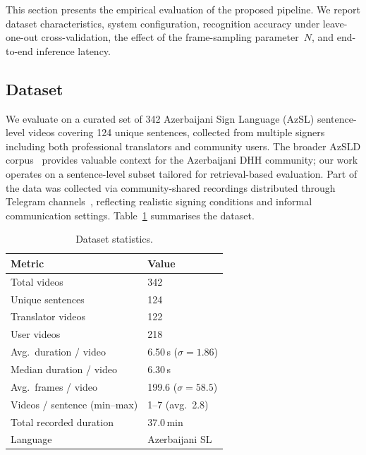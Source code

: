 \documentclass[runningheads]{llncs}
\begin{document}
This section presents the empirical evaluation of the proposed pipeline.
We report dataset characteristics, system configuration, recognition
accuracy under leave-one-out cross-validation, the effect of the
frame-sampling parameter~$N$, and end-to-end inference latency.

\subsection{Dataset}\label{sec:dataset}

We evaluate on a curated set of 342 Azerbaijani Sign Language (AzSL)
sentence-level videos covering 124 unique sentences, collected from
multiple signers including both professional translators and community
users.
The broader AzSLD corpus~\cite{alishzade2024azsld} provides valuable
context for the Azerbaijani DHH community; our work operates on a
sentence-level subset tailored for retrieval-based evaluation.
Part of the data was collected via community-shared recordings
distributed through Telegram channels~\cite{mustafazada2025crowdsourcing},
reflecting realistic signing conditions and informal communication
settings.
Table~\ref{tab:dataset} summarises the dataset.

\begin{table}[t]
\centering
\caption{Dataset statistics.}
\label{tab:dataset}
\begin{tabular}{@{}ll@{}}
\toprule
Metric & Value \\
\midrule
Total videos           & 342 \\
Unique sentences       & 124 \\
Translator videos      & 122 \\
User videos            & 218 \\
Avg.\ duration / video & 6.50\,s ($\sigma = 1.86$) \\
Median duration / video & 6.30\,s \\
Avg.\ frames / video   & 199.6 ($\sigma = 58.5$) \\
Videos / sentence (min--max) & 1--7 (avg.\ 2.8) \\
Total recorded duration & 37.0\,min \\
Language               & Azerbaijani SL \\
\bottomrule
\end{tabular}
\end{table}
\end{document}
